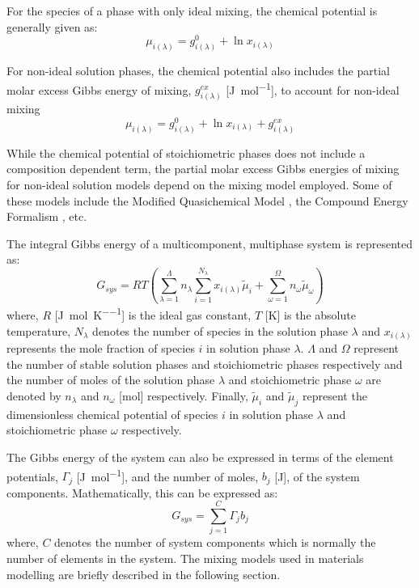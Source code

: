 	For the species of a phase with only ideal mixing, the chemical potential is generally given as:
    	\begin{equation}
        		\mu_{i(\lambda)} = g_{i(\lambda)}^0 + \ln x_{i(\lambda)}
    	\end{equation}

	For non-ideal solution phases, the chemical potential also includes the partial molar excess Gibbs energy of mixing, $g_{i(\lambda)}^{ex}$ [\si{\joule \per \mole}], to account for non-ideal mixing
    	\begin{equation}
        		\mu_{i(\lambda)} = g_{i(\lambda)}^0 + \ln x_{i(\lambda)} + g_{i(\lambda)}^{ex}
    	\end{equation}

    	While the chemical potential of stoichiometric phases does not include a composition dependent term, the partial molar excess Gibbs energies of mixing for non-ideal solution models depend on the mixing model employed. Some of these models include the Modified Quasichemical Model \cite{Pelton00,Pelton01,Chartrand01,Pelton01b,Lambotte11}, the Compound Energy Formalism \cite{Hillert01}, etc.

	The integral Gibbs energy of a multicomponent, multiphase system is represented as:
    	\begin{equation}\label{eqn:integralGibbs}
        		G_{sys} = RT \left ( \sum_{\lambda=1}^{\Lambda} n_{\lambda} \sum_{i=1}^{N_{\lambda}}x_{i({\lambda})}\tilde{\mu}_i + \sum_{\omega=1}^{\Omega} n_{\omega} \tilde{\mu}_{\omega} \right )
    	\end{equation}
    	where, $R$ [\si{\joule \per \mole \per \kelvin}] is the ideal gas constant, $T$ [\si{\kelvin}] is the absolute temperature, $N_{\lambda}$ denotes the number of species in the solution phase $\lambda$ and $x_{i({\lambda})}$ represents the mole fraction of species $i$ in solution phase $\lambda$. $\Lambda$ and $\Omega$ represent the number of stable solution phases and stoichiometric phases respectively and the number of moles of the solution phase $\lambda$ and stoichiometric phase $\omega$ are denoted by $n_\lambda$ and $n_\omega$ [\si{\mole}] respectively. Finally, $\tilde{\mu}_i$ and $\tilde{\mu}_j$ represent the dimensionless chemical potential of species $i$ in solution phase $\lambda$ and stoichiometric phase $\omega$ respectively.

	The Gibbs energy of  the system can also be expressed in terms of the element potentials, $\Gamma_j$ [\si{\joule \per \mole}], and the number of moles, $b_j$ [\si{\joule}], of the system components. Mathematically, this can be expressed as:
	\begin{equation}\label{eq:elempot}
        		G_{sys} = \sum_{j=1}^{C} \Gamma_j b_j
    	\end{equation}
	where, $C$ denotes the number of system components which is normally the number of elements in the system. The mixing models used in materials modelling are briefly described in the following section.

